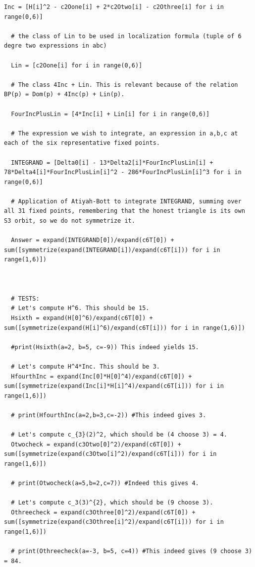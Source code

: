 \documentclass{article}
\begin{document}
\begin{lstlisting}[basicstyle=\ttfamily\tiny]
  Inc = [H[i]^2 - c2Oone[i] + 2*c2Otwo[i] - c2Othree[i] for i in range(0,6)]
  
  # the class of Lin to be used in localization formula (tuple of 6 degre two expressions in abc)
  
  Lin = [c2Oone[i] for i in range(0,6)]
  
  # The class 4Inc + Lin. This is relevant because of the relation BP(p) = Dom(p) + 4Inc(p) + Lin(p).
  
  FourIncPlusLin = [4*Inc[i] + Lin[i] for i in range(0,6)]
  
  # The expression we wish to integrate, an expression in a,b,c at each of the six representative fixed points.
  
  INTEGRAND = [Delta0[i] - 13*Delta2[i]*FourIncPlusLin[i] + 78*Delta4[i]*FourIncPlusLin[i]^2 - 286*FourIncPlusLin[i]^3 for i in range(0,6)]
  
  # Application of Atiyah-Bott to integrate INTEGRAND, summing over all 31 fixed points, remembering that the honest triangle is its own S3 orbit, so we do not symmetrize it.  
  
  Answer = expand(INTEGRAND[0])/expand(c6T[0]) + sum([symmetrize(expand(INTEGRAND[i])/expand(c6T[i])) for i in range(1,6)])
  
  
  
  # TESTS: 
  # Let's compute H^6. This should be 15.
  Hsixth = expand(H[0]^6)/expand(c6T[0]) + sum([symmetrize(expand(H[i]^6)/expand(c6T[i])) for i in range(1,6)])
  
  #print(Hsixth(a=2, b=5, c=-9)) This indeed yields 15.
  
  # Let's compute H^4*Inc. This should be 3. 
  HfourthInc = expand(Inc[0]*H[0]^4)/expand(c6T[0]) + sum([symmetrize(expand(Inc[i]*H[i]^4)/expand(c6T[i])) for i in range(1,6)])
  
  # print(HfourthInc(a=2,b=3,c=-2)) #This indeed gives 3.
  
  # Let's compute c_{3}(2)^2, which should be (4 choose 3) = 4. 
  Otwocheck = expand(c3Otwo[0]^2)/expand(c6T[0]) + sum([symmetrize(expand(c3Otwo[i]^2)/expand(c6T[i])) for i in range(1,6)])
  
  # print(Otwocheck(a=5,b=2,c=7)) #Indeed this gives 4.
  
  # Let's compute c_3(3)^{2}, which should be (9 choose 3).
  Othreecheck = expand(c3Othree[0]^2)/expand(c6T[0]) + sum([symmetrize(expand(c3Othree[i]^2)/expand(c6T[i])) for i in range(1,6)])
  
  # print(Othreecheck(a=-3, b=5, c=4)) #This indeed gives (9 choose 3) = 84.
  

\end{lstlisting}
\end{document}
